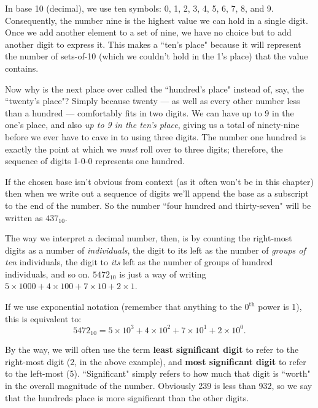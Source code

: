 In base 10 (decimal), we use ten symbols: 0, 1, 2, 3, 4, 5, 6, 7, 8, and 9.
Consequently, the number nine is the highest value we can hold in a single
digit. Once we add another element to a set of nine, we have no choice but
to add another digit to express it. This makes a ``ten's place" because it
will represent the number of sets-of-10 (which we couldn't hold in the 1's
place) that the value contains.

Now why is the next place over called the ``hundred's place" instead of,
say, the ``twenty's place"? Simply because twenty --- as well as every
other number less than a hundred --- comfortably fits in two digits. We can
have up to 9 in the one's place, and also \textit{up to 9 in the ten's
place}, giving us a total of ninety-nine before we ever have to cave in to
using three digits. The number one hundred is exactly the point at which we
\textit{must} roll over to three digits; therefore, the sequence of digits
1-0-0 represents one hundred.

If the chosen base isn't obvious from context (as it often won't be in this
chapter) then when we write out a sequence of digits we'll append the base
as a subscript to the end of the number. So the number ``four hundred and
thirty-seven" will be written as $437_{10}$.

The way we interpret a decimal number, then, is by counting the right-most
digits as a number of \textit{individuals}, the digit to its left as the
number of \textit{groups of ten} individuals, the digit to \textit{its}
left as the number of groups of hundred individuals, and so on. $5472_{10}$
is just a way of writing $5 \times 1000 + 4 \times 100 + 7 \times 10 + 2
\times 1$.

If we use exponential notation (remember that anything to the
$0^{\text{th}}$ power is 1), this is equivalent to:
\[
5472_{10} = 5 \times 10^3 + 4 \times 10^2 + 7 \times 10^1 + 2 \times 10^0.
\]

By the way, we will often use the term \textbf{least significant digit} to
refer to the right-most digit (2, in the above example), and \textbf{most
significant digit} to refer to the left-most (5). ``Significant" simply
refers to how much that digit is ``worth" in the overall magnitude of the
number. Obviously 239 is less than 932, so we say that the hundreds place
is more significant than the other digits.

